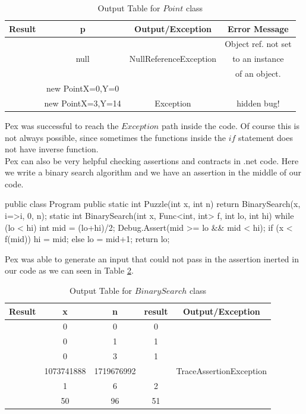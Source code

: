 \documentclass[10pt, conference, compsocconf]{IEEEtran}
\newcommand{\checkK}{\color{ForestGreen}\checkmark}
\newcommand{\cross}{\color{red}\hspace{-3pt}\ding{55}}
\begin{document}
\begin{table}[!ht]
\renewcommand{\arraystretch}{1.3}
\caption{Output Table for $Point$ class}
\label{tab:point}
\centering
\noindent \begin{tabular}{|c|c|c|c|}\hline
Result & p & Output/Exception & Error Message\\\hline
 &  &  & Object ref. not set \\
\cross & null  & NullReferenceException & to an instance \\
 &  &  & of an object.\\\hline
\checkK & new Point{X=0,Y=0} & &\\\hline
\cross & new Point{X=3,Y=14} & Exception & hidden bug!\\\hline
\end{tabular}
\end{table}

Pex was successful to reach the $Exception$ path inside the code. Of course this is not always possible, since sometimes the functions inside
the $if$ statement does not have inverse function.\\

Pex can also be very helpful checking assertions and contracts in .net code. Here we write a binary search algorithm and we have an assertion in
the middle of our code.

\begin{code}
public class Program {
  public static int Puzzle(int x, int n) {
    return BinarySearch(x, i=>i, 0, n);
  }
  static int BinarySearch(int x, Func<int, int> f, int lo, int hi) {
    while (lo < hi) {
      int mid = (lo+hi)/2;
      Debug.Assert(mid >= lo && mid < hi);
      if (x < f(mid)) { hi = mid; } else { lo = mid+1; }
    }
    return lo;
  }
}
\end{code}

Pex was able to generate an input that could not pass in the assertion inerted in our code as we can seen in Table \ref{tab:binary}.

\begin{table}[!ht]
\renewcommand{\arraystretch}{1.3}
\caption{Output Table for $BinarySearch$ class}
\label{tab:binary}
\centering
\noindent \begin{tabular}{|c|c|c|c|c|}\hline
Result & x & n & result & Output/Exception \\\hline
\checkK & 0 & 0 & 0      & \\\hline
\checkK & 0 & 1 & 1      & \\\hline
\checkK & 0 & 3 & 1      & \\\hline
\cross & 1073741888 & 1719676992 & & TraceAssertionException \\\hline
\checkK & 1 & 6 & 2      & \\\hline
\checkK & 50 & 96 & 51      &\\\hline
\end{tabular}
\end{table}
\end{document}
